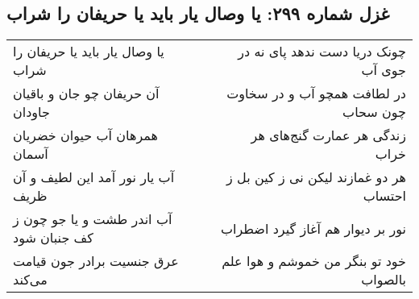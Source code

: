 \begin{center}
\section*{غزل شماره ۲۹۹: یا وصال یار باید یا حریفان را شراب}
\label{sec:0299}
\begin{longtable}{l p{0.5cm} r}
یا وصال یار باید یا حریفان را شراب
&&
چونک دریا دست ندهد پای نه در جوی آب
\\
آن حریفان چو جان و باقیان جاودان
&&
در لطافت همچو آب و در سخاوت چون سحاب
\\
همرهان آب حیوان خضریان آسمان
&&
زندگی هر عمارت گنج‌های هر خراب
\\
آب یار نور آمد این لطیف و آن ظریف
&&
هر دو غمازند لیکن نی ز کین بل ز احتساب
\\
آب اندر طشت و یا جو چون ز کف جنبان شود
&&
نور بر دیوار هم آغاز گیرد اضطراب
\\
عرق جنسیت برادر جون قیامت می‌کند
&&
خود تو بنگر من خموشم و هوا علم بالصواب
\\
\end{longtable}
\end{center}
